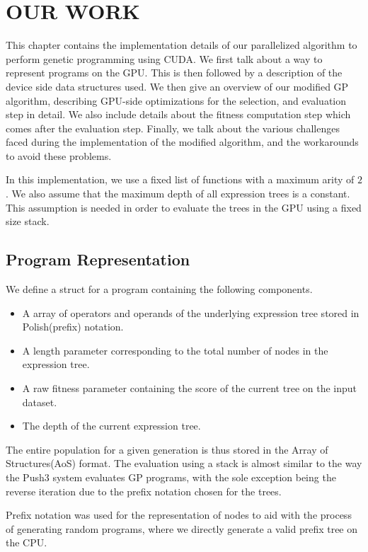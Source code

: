 \chapter{OUR WORK}
\label{chap:ourwork}
This chapter contains the implementation details of our parallelized algorithm to perform genetic programming using CUDA. We first talk about a way to represent programs on the GPU. This is then followed by a description of the device side data structures used. We then give an overview of our modified GP algorithm, describing GPU-side optimizations for the selection, and evaluation step in detail. We also include details about the fitness computation step which comes after the evaluation step. Finally, we talk about the various challenges faced during the implementation of the modified algorithm, and the workarounds to avoid these problems.

In this implementation, we use a fixed list of functions with a maximum arity of $2$. We also assume that the maximum depth of all expression trees is a constant. This assumption is needed in order to evaluate the trees in the GPU using a fixed size stack.

\section{Program Representation}
\label{ow:input}
We define a struct for a program containing the following components. 
\begin{itemize}
    \item A array of operators and operands of the underlying expression tree stored in Polish(prefix) notation.
    \item A length parameter corresponding to the total number of nodes in the expression tree. 
    \item A raw fitness parameter containing the score of the current tree on the input dataset. 
    \item The depth of the current expression tree. 
\end{itemize}

The entire population for a given generation is thus stored in the Array of Structures(AoS) format. The evaluation using a stack is almost similar to the way the Push3 system \citep{push3Stack} evaluates GP programs, with the sole exception being the reverse iteration due to the prefix notation chosen for the trees. 

Prefix notation was used for the representation of nodes to aid with the process of generating random programs, where we directly generate a valid prefix tree on the CPU.

